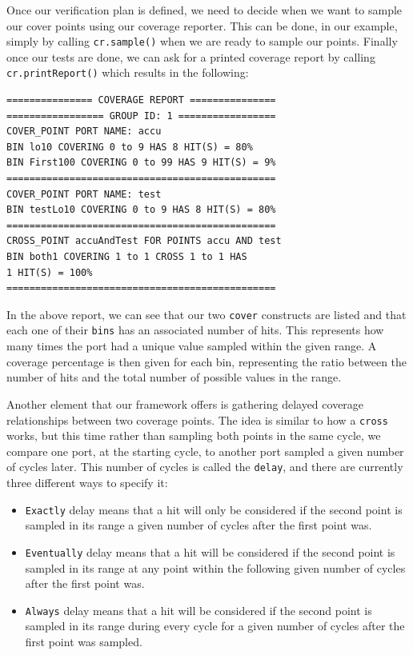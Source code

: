 \documentclass[conference]{IEEEtran}
\begin{document}
Once our verification plan is defined, we need to decide when we want to sample our cover points using our coverage reporter.
This can be done, in our example, simply by calling \texttt{cr.sample()} when we are ready to sample our points. 
Finally once our tests are done, we can ask for a printed coverage report by calling \texttt{cr.printReport()} which results in the following: 
\begin{verbatim}
=============== COVERAGE REPORT ===============
================= GROUP ID: 1 =================
COVER_POINT PORT NAME: accu
BIN lo10 COVERING 0 to 9 HAS 8 HIT(S) = 80%
BIN First100 COVERING 0 to 99 HAS 9 HIT(S) = 9%
===============================================
COVER_POINT PORT NAME: test
BIN testLo10 COVERING 0 to 9 HAS 8 HIT(S) = 80%
===============================================
CROSS_POINT accuAndTest FOR POINTS accu AND test
BIN both1 COVERING 1 to 1 CROSS 1 to 1 HAS
1 HIT(S) = 100%
===============================================
\end{verbatim}
In the above report, we can see that our two \texttt{cover} constructs are listed and that each one of their \texttt{bins} has an associated number of hits. 
This represents how many times the port had a unique value sampled within the given range. 
A coverage percentage is then given for each bin, representing the ratio between the number of hits and the total number of possible values in the range.

Another element that our framework offers is gathering delayed coverage relationships between two coverage points. 
The idea is similar to how a \texttt{cross} works, but this time rather than sampling both points in the same cycle, we compare one port, at the starting cycle, to another port sampled a given number of cycles later. 
This number of cycles is called the \texttt{delay}, and there are currently three different ways to specify it:  
\begin{itemize}
  \item \texttt{Exactly} delay means that a hit will only be considered if the second point is sampled in its range a given number of cycles after the first point was.
  \item \texttt{Eventually} delay means that a hit will be considered if the second point is sampled in its range at any point within the following given number of cycles after the first point was.  
  \item \texttt{Always} delay means that a hit will be considered if the second point is sampled in its range during every cycle for a given number of cycles after the first point was sampled.
\end{itemize}
\end{document}
